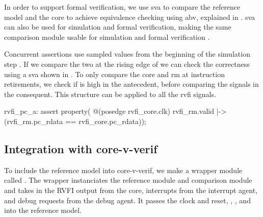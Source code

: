 In order to support formal verification, we use \acrfull{sva} to compare the reference model and the core to achieve equivalence checking using \acrfull{abv}, explained in . \acrshort{sva} can also be used for simulation and formal verification, making the same comparison module usable for simulation and formal verification \cite{cernySVAPowerAssertions2015}. 


Concurrent assertions use sampled values from the beginning of the simulation step \cite{cernySVAPowerAssertions2015}. 
If we compare the two at the rising edge of  we can check the correctness using a \acrshort{sva} shown in . To only compare the core and \acrshort{rm} at instruction retirements, we check if  is high in the antecedent, before comparing the  signals in the consequent. This structure can be applied to all the \acrshort{rvfi} signals.

\begin{systemverilog}[caption={Assertion comparing the PC of the \acrshort{rm} and core.}, label={lst:pc_assertion}]
rvfi_pc_a: assert property( @(posedge rvfi_core.clk)
    rvfi_rm.valid |-> (rvfi_rm.pc_rdata == rvfi_core.pc_rdata));
\end{systemverilog}




\subsection{Integration with core-v-verif}

To include the reference model into core-v-verif, we make a wrapper module called . The wrapper instanciates the reference module and comparison module and takes in the RVFI output from the core, interrupts from the interrupt agent, and debug requests from the debug agent. It passes the clock and reset, , , and  into the reference model.

